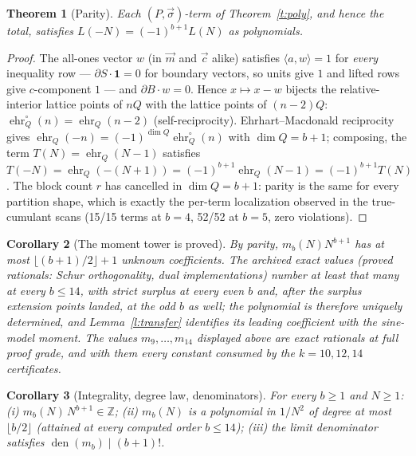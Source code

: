 \documentclass[11pt]{article}
\numberwithin{equation}{section}
\newtheorem{theorem}{Theorem}[section]
\newtheorem{corollary}[theorem]{Corollary}
\theoremstyle{definition}
\theoremstyle{remark}
\begin{document}
\begin{theorem}[Parity]\label{t:parity}
Each $(P,\vec\sigma)$-term of Theorem~\ref{t:poly}, and
hence the total, satisfies
$L(-N)=(-1)^{b+1}L(N)$ as polynomials.
\end{theorem}

\begin{proof}
The all-ones vector $w$ (in $\vec m$ and $\vec c$ alike)
satisfies $\langle a,w\rangle=1$ for \emph{every} inequality
row --- $\partial S\cdot\mathbf 1=0$ for boundary vectors, so
units give $1$ and lifted rows give $c$-component $1$ --- and
$\partial B\cdot w=0$. Hence $x\mapsto x-w$ bijects the
relative-interior lattice points of $nQ$ with the lattice
points of $(n-2)Q$:
$\operatorname{ehr}_Q^{\circ}(n)=\operatorname{ehr}_Q(n-2)$
(self-reciprocity). Ehrhart--Macdonald reciprocity gives
$\operatorname{ehr}_Q(-n)=(-1)^{\dim Q}
\operatorname{ehr}_Q^{\circ}(n)$ with $\dim Q=b+1$;
composing, the term $T(N)=\operatorname{ehr}_Q(N-1)$
satisfies $T(-N)=\operatorname{ehr}_Q(-(N+1))
=(-1)^{b+1}\operatorname{ehr}_Q(N-1)=(-1)^{b+1}T(N)$. The
block count $r$ has cancelled in $\dim Q=b+1$: parity is the
same for every partition shape, which is exactly the
per-term localization observed in the true-cumulant scans
(15/15 terms at $b=4$, 52/52 at $b=5$, zero violations).
\end{proof}

\begin{corollary}[The moment tower is proved]\label{c:pin}
By parity, $m_b(N)N^{b+1}$ has at most
$\lfloor(b{+}1)/2\rfloor+1$ unknown coefficients. The
archived exact values (proved rationals: Schur orthogonality,
dual implementations) number at least that many at every
$b\le14$, with strict surplus at every even $b$ and, after
the surplus extension points landed, at the odd $b$ as well;
the polynomial is therefore uniquely determined, and
Lemma~\ref{l:transfer} identifies its leading coefficient
with the sine-model moment. The values
$m_9,\dots,m_{14}$ displayed above are exact rationals at
full proof grade, and with them every constant consumed by
the $k=10,12,14$ certificates.
\end{corollary}

\begin{corollary}[Integrality, degree law,
denominators]\label{c:struct}
For every $b\ge1$ and $N\ge1$: (i)
$m_b(N)\,N^{b+1}\in\mathbb Z$; (ii) $m_b(N)$ is a polynomial
in $1/N^{2}$ of degree at most $\lfloor b/2\rfloor$
(attained at every computed order $b\le14$); (iii) the limit
denominator satisfies
$\operatorname{den}(m_b)\mid(b{+}1)!$.
\end{corollary}
\end{document}
